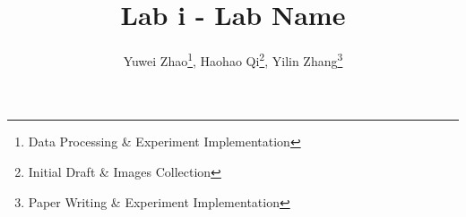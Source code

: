\title{
  \textbf{Lab i - Lab Name}
}
\author{
  Yuwei Zhao\thanks{Data Processing \& Experiment Implementation}, 
  Haohao Qi\thanks{Initial Draft \& Images Collection}, 
  Yilin Zhang\thanks{Paper Writing \& Experiment Implementation}
}
\date{}